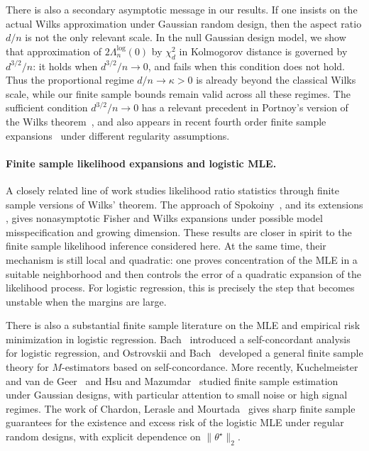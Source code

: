 \documentclass[11pt, letterpaper, hidelinks]{article}
\newcommand{\1}{\mathbf 1}
\theoremstyle{plain}
\theoremstyle{definition}
\newcommand{\thetastar}{\theta^\star}
\begin{document}
There is also a secondary asymptotic message in our results. If one insists on
the actual Wilks approximation under Gaussian random design, then the aspect
ratio \(d/n\) is not the only relevant scale. In the null Gaussian design model,
we show that approximation of \(2\Lambda_n^{\operatorname{log}}(0)\) by
\(\chi_d^2\) in Kolmogorov distance is governed by \(d^{3/2}/n\): it holds when
\(d^{3/2}/n\to0\), and fails when this condition does not hold. Thus the
proportional regime \(d/n\to\kappa>0\) is already beyond the classical Wilks
scale, while our finite sample bounds remain valid across all these regimes.
The sufficient condition \(d^{3/2}/n\to0\) has a relevant precedent in
Portnoy's version of the Wilks theorem~\cite{Portnoy1988}, and also appears
in recent fourth order finite sample expansions~\cite{Spokoiny2025SLS} under
different regularity assumptions.

\paragraph{Finite sample likelihood expansions and logistic MLE.}

A closely related line of work studies likelihood ratio statistics through
finite sample versions of Wilks' theorem. The approach of
Spokoiny~\cite{Spokoiny2012Parametric}, and its extensions
\cite{AndresenSpokoiny2014,SpokoinyZhilova2015}, gives nonasymptotic Fisher
and Wilks expansions under possible model misspecification and growing
dimension. These results are closer in spirit to the finite sample likelihood
inference considered here. At the same time, their mechanism is still local and
quadratic: one proves concentration of the MLE in a suitable neighborhood and
then controls the error of a quadratic expansion of the likelihood process. For
logistic regression, this is precisely the step that becomes unstable when the
margins are large.

There is also a substantial finite sample literature on the MLE and empirical
risk minimization in logistic regression. Bach~\cite{Bach2010SelfConcordant}
introduced a self-concordant analysis for logistic regression, and
Ostrovskii and Bach~\cite{ostrovskii2021finite} developed a general finite
sample theory for \(M\)-estimators based on self-concordance. More recently,
Kuchelmeister and van de Geer~\cite{KuchelmeisterVandeGeer2024} and Hsu and
Mazumdar~\cite{HsuMazumdar2024} studied finite sample estimation under Gaussian
designs, with particular attention to small noise or high signal regimes. The
work of Chardon, Lerasle and Mourtada~\cite{chardon2024logistic} gives sharp
finite sample guarantees for the existence and excess risk of the logistic MLE
under regular random designs, with explicit dependence on \(\|\thetastar\|_2\).
\end{document}
